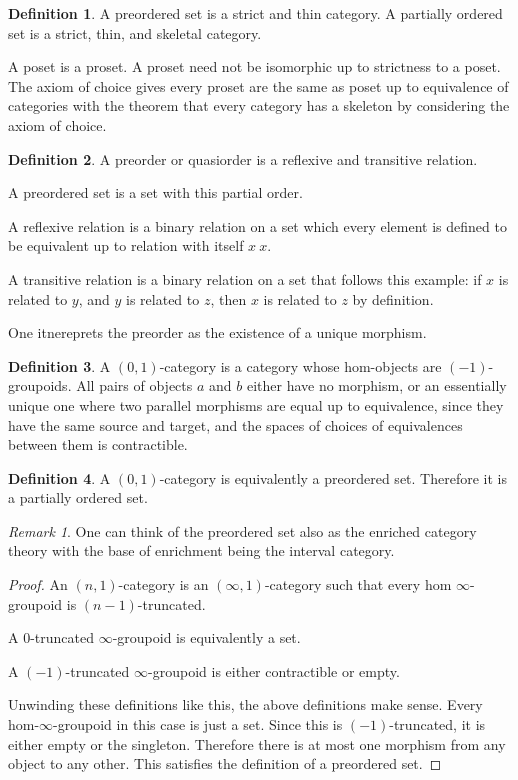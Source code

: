 \documentclass[10pt]{article}
\theoremstyle{plain}%
\theoremstyle{definition}
\newtheorem{definition}{Definition}[section]
\theoremstyle{remark}
\newtheorem*{remark}{Remark}
\begin{document}
\begin{definition}
	A preordered set is a strict and thin category. A partially ordered set is a strict, thin, and skeletal category.
\end{definition}

A poset is a proset. A proset need not be isomorphic up to strictness to a poset. The axiom of choice gives every proset are the same as poset up to equivalence of categories with the theorem that every category has a skeleton by considering the axiom of choice.

\begin{definition}
	A preorder or quasiorder is a reflexive and transitive relation.

	A preordered set is a set with this partial order.

	A reflexive relation is a binary relation on a set which every element is defined to be equivalent up to relation with itself $x ~ x$.

	A transitive relation is a binary relation on a set that follows this example: if $x$ is related to $y$, and $y$ is related to $z$, then $x$ is related to $z$ by definition.
\end{definition}

One itnereprets the preorder as the existence of a unique morphism.

\begin{definition}
	A $(0,1)$-category is a category whose hom-objects are $(-1)$-groupoids. All pairs of objects $a$ and $b$ either have no morphism, or an essentially unique one where two parallel morphisms are equal up to equivalence, since they have the same source and target, and the spaces of choices of equivalences between them is contractible.
\end{definition}

\begin{definition}
	A $(0,1)$-category is equivalently a preordered set. Therefore it is a partially ordered set.
\end{definition}

\begin{remark}
	One can think of the preordered set also as the enriched category theory with the base of enrichment being the interval category.
\end{remark}

\begin{proof}
	An $(n,1)$-category is an $(\infty,1)$-category such that every hom $\infty$-groupoid is $(n-1)$-truncated.
	
	A $0$-truncated $\infty$-groupoid is equivalently a set.
	
	A $(-1)$-truncated $\infty$-groupoid is either contractible or empty.

	Unwinding these definitions like this, the above definitions make sense. Every hom-$\infty$-groupoid in this case is just a set. Since this is $(-1)$-truncated, it is either empty or the singleton. Therefore there is at most one morphism from any object to any other. This satisfies the definition of a preordered set.
\end{proof}
\end{document}
